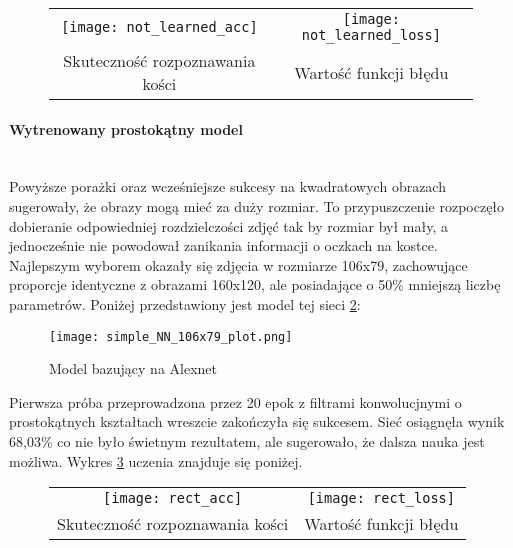 \begin{figure}[h!]
\begin{center}
\begin{tabular}{cc}
\texttt{[image: not\_learned\_acc]} &
\texttt{[image: not\_learned\_loss]} \\
 Skuteczność rozpoznawania kości & Wartość funkcji błędu\\
\end{tabular}
\label{fig:not_learned}
\end{center}
\end{figure}

\paragraph{Wytrenowany prostokątny model} \mbox{}\\
Powyższe porażki oraz wcześniejsze sukcesy na kwadratowych obrazach sugerowały, że
obrazy mogą mieć za duży rozmiar. To przypuszczenie rozpoczęło dobieranie
odpowiedniej rozdzielczości zdjęć tak by rozmiar był mały, a jednocześnie nie powodował
zanikania informacji o oczkach na kostce. Najlepszym wyborem okazały się zdjęcia w rozmiarze 106x79,
zachowujące proporcje identyczne z obrazami 160x120, ale posiadające o 50\% mniejszą liczbę parametrów.
Poniżej przedstawiony jest model tej sieci \ref{fig:simple_106x79}:
\newpage
\begin{figure}[h!]
\centering
\texttt{[image: simple\_NN\_106x79\_plot.png]}
\caption{Model bazujący na Alexnet}
\label{fig:simple_106x79}
\end{figure}
Pierwsza próba przeprowadzona przez 20 epok z filtrami konwolucjnymi o prostokątnych
kształtach wreszcie zakończyła się sukcesem. Sieć osiągnęła wynik 68,03\% co nie
było świetnym rezultatem, ale sugerowało, że dalsza nauka jest możliwa. Wykres \ref{fig:rect_learned} uczenia znajduje się poniżej.\\

\begin{figure}[h!]
\begin{center}
\begin{tabular}{cc}
\texttt{[image: rect\_acc]} &
\texttt{[image: rect\_loss]} \\
 Skuteczność rozpoznawania kości & Wartość funkcji błędu\\
\end{tabular}
\label{fig:rect_learned}
\end{center}
\end{figure}

